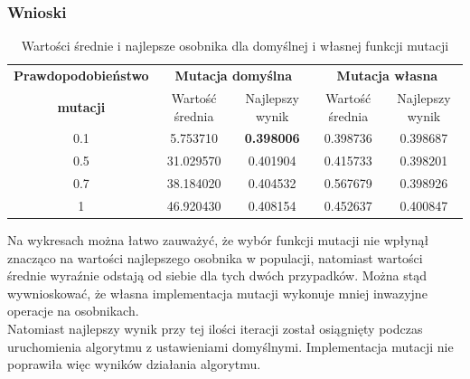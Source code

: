 \vline

\subsubsection{Wnioski}

\begin{table}[!h]
	\hspace*{-1.5in}
	\centering
	\caption{Wartości średnie i najlepsze osobnika dla domyślnej i własnej funkcji mutacji}
	\label{mut_porownanie}
	\hspace*{-0.4in}
	\begin{tabular}{|c|c|c|c|c|}
		\hline
		\textbf{Prawdopodobieństwo} & \multicolumn{2}{c}{\textbf{Mutacja domyślna}}  & \multicolumn{2}{|c|}{\textbf{Mutacja własna}} \\ \cline{2-5}
		\textbf{mutacji} & Wartość średnia & Najlepszy wynik & Wartość średnia & Najlepszy wynik \\ \hline
		
		0.1 & 5.753710  & \textbf{{\color{green} 0.398006 }} & 0.398736 & 0.398687 \\
		0.5 & 31.029570 & 0.401904 & 0.415733 & 0.398201 \\
		0.7 & 38.184020 & 0.404532 & 0.567679 & 0.398926 \\
		1   & 46.920430 & 0.408154 & 0.452637 & 0.400847  \\ \hline      
	\end{tabular}
\end{table}

Na wykresach można łatwo zauważyć, że wybór funkcji mutacji nie wpłynął znacząco na wartości najlepszego osobnika w populacji, natomiast wartości średnie wyraźnie odstają od siebie dla tych dwóch przypadków. Można stąd wywnioskować, że własna implementacja mutacji wykonuje mniej inwazyjne operacje na osobnikach. \\
Natomiast najlepszy wynik przy tej ilości iteracji został osiągnięty podczas uruchomienia algorytmu z ustawieniami domyślnymi. Implementacja mutacji nie poprawiła więc wyników działania algorytmu.